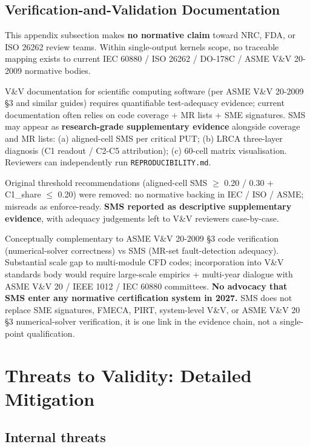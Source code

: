 \documentclass[manuscript,screen,review]{acmart}
\begin{document}
\subsection{Verification-and-Validation Documentation}\label{e.3-vv-documentation-conceptual-complementarity-with-asme-vv-20-2009}

This appendix subsection makes \textbf{no normative claim} toward NRC,
FDA, or ISO 26262 review teams. Within single-output kernels scope, no
traceable mapping exists to current IEC 60880 / ISO 26262 / DO-178C /
ASME V\&V 20-2009 normative bodies.

V\&V documentation for scientific computing software (per ASME V\&V
20-2009 §3 and similar guides) requires quantifiable test-adequacy
evidence; current documentation often relies on code coverage + MR lists
+ SME signatures. SMS may appear as \textbf{research-grade supplementary
evidence} alongside coverage and MR lists: (a) aligned-cell SMS per
critical PUT; (b) LRCA three-layer diagnosis (C1 readout / C2-C5
attribution); (c) 60-cell matrix visualisation. Reviewers can
independently run \texttt{REPRODUCIBILITY.md}.

Original threshold recommendations (aligned-cell SMS $\geq$ 0.20 / 0.30 +
C1\_share $\leq$ 0.20) were removed: no normative backing in IEC / ISO /
ASME; misreads as enforce-ready. \textbf{SMS reported as descriptive
supplementary evidence}, with adequacy judgements left to V\&V reviewers
case-by-case.

Conceptually complementary to ASME V\&V 20-2009 §3 code verification
(numerical-solver correctness) vs SMS (MR-set fault-detection adequacy).
Substantial scale gap to multi-module CFD codes; incorporation into V\&V
standards body would require large-scale empirics + multi-year
dialogue with ASME V\&V 20 / IEEE 1012 / IEC 60880 committees.
\textbf{No advocacy that SMS enter any normative certification system in
2027.} SMS does not replace SME signatures, FMECA, PIRT, system-level
V\&V, or ASME V\&V 20 §3 numerical-solver verification, it is one
link in the evidence chain, not a single-point qualification.


\section{Threats to Validity: Detailed Mitigation}\label{f.-threats-to-validity-detailed-mitigation}

\subsection{Internal threats}\label{f.1-internal-threats}
\end{document}
